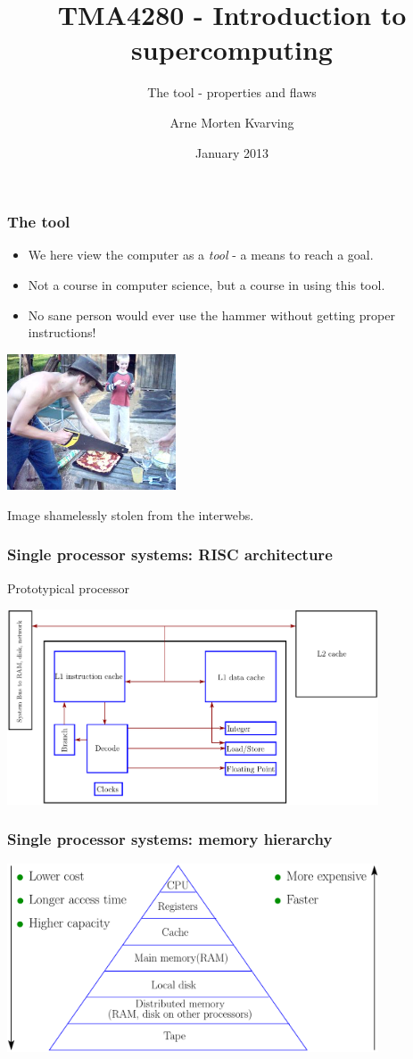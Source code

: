 \documentclass{beamer}
\title{TMA4280 - Introduction to supercomputing}
\subtitle{The tool - properties and flaws}
\author{Arne Morten Kvarving}
\institute{NTNU and SINTEF ICT}
\date{January 2013}
\begin{document}
\maketitle


\begin{frame}\frametitle{The tool}
  \begin{itemize}
    \item We here view the computer as a \emph{tool} - a means to reach a goal.
    \item Not a course in computer science, but a course in using this tool.
    \item No sane person would ever use the hammer without getting proper instructions!
  \end{itemize}
  \begin{center}
    \includegraphics[width=5cm]{wrong-tool-pizza}
  \end{center}
  Image shamelessly stolen from the interwebs.
\end{frame}

\begin{frame}\frametitle{Single processor systems: RISC architecture}
Prototypical processor
\begin{center}
  \includegraphics[width=11cm]{../../notes/01.single/Lande}
\end{center}
\end{frame}

\begin{frame}\frametitle{Single processor systems: memory hierarchy}
  \begin{center}
    \includegraphics[width=11cm]{../../notes/01.single/MemoryHierarchy}
  \end{center}
\end{frame}
\end{document}
